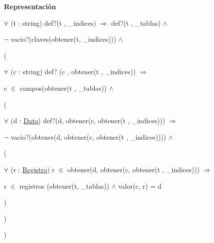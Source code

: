 \begin{Indent}{\bf Representación}
{$\forall$ (t \-: string) def?(t , \-\_\-indices) $\Rightarrow$ def?(t , \-\_\-tablas) $\land$
\begin{DoxyItemize}
\item $\lnot$ vacio?(claves(obtener(t, \-\_\-indices))) $\land$
\item (
\begin{DoxyItemize}
\item $\forall$ (c \-: string) def? (c , obtener(t , \-\_\-indices)) $\Rightarrow$
\begin{DoxyItemize}
\item c $\in$ campos(obtener(t , \-\_\-tablas)) $\land$
\item (
\begin{DoxyItemize}
\item $\forall$ (d \-: \hyperlink{classDato}{Dato}) def?(d, obtener(c, obtener(t , \-\_\-indices))) $\Rightarrow$
\begin{DoxyItemize}
\item $\lnot$ vacio?(obtener(d, obtener(c, obtener(t , \-\_\-indices)))) $\land$
\item (
\begin{DoxyItemize}
\item $\forall$ (r \-: \hyperlink{classRegistro}{Registro}) r $\in$ obtener(d, obtener(c, obtener(t , \-\_\-indices))) $\Rightarrow$
\begin{DoxyItemize}
\item r $\in$ registros (obtener(t, \-\_\-tablas)) $\land$ valor(c, r) = d
\end{DoxyItemize}
\end{DoxyItemize}
\item )
\end{DoxyItemize}
\end{DoxyItemize}
\item )
\end{DoxyItemize}
\end{DoxyItemize}
\item )
\end{DoxyItemize}

}
\end{Indent}
